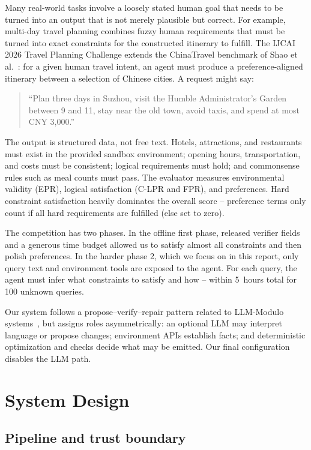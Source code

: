 \documentclass{article}
\makeatletter
\newcommand\footnoteref[1]{\protected@xdef\@thefnmark{\ref{#1}}\@footnotemark}
\makeatother
\begin{document}
Many real-world tasks involve a loosely stated human goal that needs to be turned
into an output that is not merely plausible but correct. For example, multi-day travel
planning combines fuzzy human requirements that must be turned into exact
constraints for the constructed itinerary to fulfill.
The IJCAI 2026 Travel Planning Challenge\footnoteref{tpc}
extends the ChinaTravel benchmark of Shao et al.~\cite{shao2024chinatravel}: for a given human travel intent, an agent must
produce a preference-aligned itinerary between a selection of Chinese cities. A request
might say:
\begin{quote}
\small ``Plan three days in Suzhou, visit the Humble Administrator's Garden
between 9 and 11, stay near the old town, avoid taxis, and spend at most CNY 3,000.''
\end{quote}
The output is structured data, not free text. Hotels, attractions, and restaurants
must exist in the provided sandbox environment; opening hours, transportation, and costs must be
consistent; logical requirements must hold; and commonsense rules such as meal
counts must pass. The evaluator measures environmental validity (EPR), logical
satisfaction (C-LPR and FPR), and preferences. Hard constraint satisfaction heavily dominates the overall score -- preference terms only count if all hard requirements are fulfilled (else set to zero).

The competition has two phases. In the offline first phase, released verifier
fields and a generous time budget allowed us to satisfy almost all constraints
and then polish preferences. In the harder phase 2, which we focus on in this report, only
query text and environment tools are exposed to the agent. 
For each query, the agent must infer what constraints to satisfy and how -- within 5~hours total for 100 unknown queries.

Our system follows a propose--verify--repair pattern related to LLM-Modulo
systems~\cite{kambhampati2024llmmodulo}, but assigns roles asymmetrically:
an optional LLM may interpret language or propose changes; environment APIs
establish facts; and deterministic optimization and checks decide what may be
emitted. Our final configuration disables the LLM path.

\section{System Design}
\label{sec:system}

\subsection{Pipeline and trust boundary}
\end{document}

